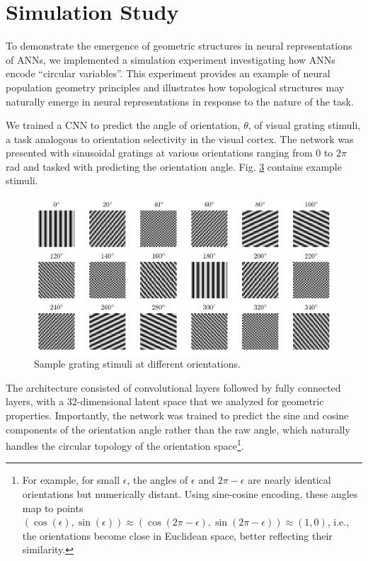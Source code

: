 \documentclass[11pt,a4paper]{article}
\begin{document}
\begin{figure}
\begin{subfigure}[b]{0.48\textwidth}
        \label{fig:mouse_regression}
    \end{subfigure}

    \label{fig:mouse_manifold_analysis}
\end{figure}

\section{Simulation Study}

To demonstrate the emergence of geometric structures in neural representations of ANNs, we implemented a simulation experiment investigating how ANNs encode ``circular variables''. This experiment provides an example of neural population geometry principles and illustrates how topological structures may naturally emerge in neural representations in response to the nature of the task.


We trained a CNN to predict the angle of orientation, $\theta$, of visual grating stimuli, a task analogous to orientation selectivity in the visual cortex. The network was presented with sinusoidal gratings at various orientations ranging from 0 to $2\pi$ rad and tasked with predicting the orientation angle. Fig. \ref{fig:grating_samples} contains example stimuli.

\begin{figure}
    \centering
    \includegraphics[width=\linewidth]{results/grating_samples.pdf}
    \caption{Sample grating stimuli at different orientations.}
    \label{fig:grating_samples}
\end{figure}

The architecture consisted of convolutional layers followed by fully connected layers, with a 32-dimensional latent space that we analyzed for geometric properties. Importantly, the network was trained to predict the sine and cosine components of the orientation angle rather than the raw angle, which naturally handles the circular topology of the orientation space\footnote{For example, for small $\epsilon$, the angles of $\epsilon$ and $2\pi - \epsilon$ are nearly identical orientations but numerically distant. Using sine-cosine encoding, these angles map to points $(\cos(\epsilon), \sin(\epsilon)) \approx (\cos(2\pi-\epsilon), \sin(2\pi - \epsilon)) \approx (1, 0)$, i.e., the orientations become close in Euclidean space, better reflecting their similarity.}.
\end{document}
